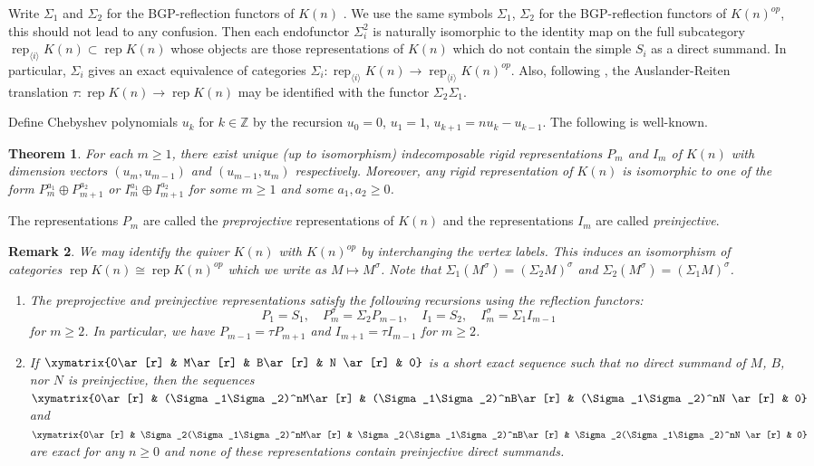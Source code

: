 \documentclass{amsart}
\newtheorem{theorem}{Theorem}[section]
\newtheorem{remark}[theorem]{Remark}
\numberwithin{equation}{section}
\newcommand{\rep}{\operatorname{rep}}
\newcommand{\ZZ}{\mathbb{Z}}
\newcommand{\ses}[3]{\xymatrix{0\ar[r] & #1\ar[r] & #2\ar[r] & #3 \ar[r] & 0}}
\begin{document}
Write $\Sigma_1$ and $\Sigma_2$ for the BGP-reflection functors of $K(n)$ \cite{bgp}. 
We use the same symbols $\Sigma_1$, $\Sigma_2$ for the BGP-reflection functors of $K(n)^{op}$, this should not lead to any confusion. 
Then each endofunctor $\Sigma_i^2$ is naturally isomorphic to the identity map on the full subcategory $\rep_{\langle i\rangle} K(n)\subset \rep K(n)$ whose objects are those representations of $K(n)$ which do not contain the simple $S_i$ as a direct summand.
In particular, $\Sigma_i$ gives an exact equivalence of categories $\Sigma_i:\rep_{\langle i\rangle} K(n)\to\rep_{\langle i\rangle} K(n)^{op}$.
Also, following \cite{brenner-butler}, the Auslander-Reiten translation $\tau:\rep K(n)\to\rep K(n)$ may be identified with the functor $\Sigma_2\Sigma_1$.

Define Chebyshev polynomials $u_k$ for $k\in\ZZ$ by the recursion $u_0=0$, $u_1=1$, $u_{k+1}=nu_k-u_{k-1}$.
The following is well-known.
\begin{theorem}
  \label{th:rigids}
  For each $m\ge1$, there exist unique (up to isomorphism) indecomposable rigid representations $P_m$ and $I_m$ of $K(n)$ with dimension vectors $(u_m,u_{m-1})$ and $(u_{m-1},u_m)$ respectively. 
  Moreover, any rigid representation of $K(n)$ is isomorphic to one of the form $P_m^{a_1}\oplus P_{m+1}^{a_2}$ or $I_m^{a_1}\oplus I_{m+1}^{a_2}$ for some $m\ge1$ and some $a_1,a_2\ge0$.
\end{theorem}
The representations $P_m$ are called the \emph{preprojective} representations of $K(n)$ and the representations $I_m$ are called \emph{preinjective}.
\begin{remark}
  \label{rem:reflection recursion}
  We may identify the quiver $K(n)$ with $K(n)^{op}$ by interchanging the vertex labels.
  This induces an isomorphism of categories $\rep K(n)\cong\rep K(n)^{op}$ which we write as $M\mapsto M^\sigma$.
  Note that $\Sigma_1(M^\sigma)=(\Sigma_2 M)^\sigma$ and $\Sigma_2(M^\sigma)=(\Sigma_1 M)^\sigma$.
  \begin{enumerate}
    \item The preprojective and preinjective representations satisfy the following recursions using the reflection functors:
      \[P_1=S_1,\quad P_m^\sigma=\Sigma_2 P_{m-1},\quad I_1=S_2,\quad I_m^\sigma=\Sigma_1 I_{m-1}\]
      for $m\ge2$.
      In particular, we have $P_{m-1}=\tau P_{m+1}$ and $I_{m+1}=\tau I_{m-1}$ for $m\ge2$.
    \item If $\ses{M}{B}{N}$ is a short exact sequence such that no direct summand of $M$, $B$, nor $N$ is preinjective, then the sequences $\ses{(\Sigma_1\Sigma_2)^nM}{(\Sigma_1\Sigma_2)^nB}{(\Sigma_1\Sigma_2)^nN}$ and $\ses{\Sigma_2(\Sigma_1\Sigma_2)^nM}{\Sigma_2(\Sigma_1\Sigma_2)^nB}{\Sigma_2(\Sigma_1\Sigma_2)^nN}$ are exact for any $n\ge0$ and none of these representations contain preinjective direct summands.
  \end{enumerate}
\end{remark}
\end{document}
